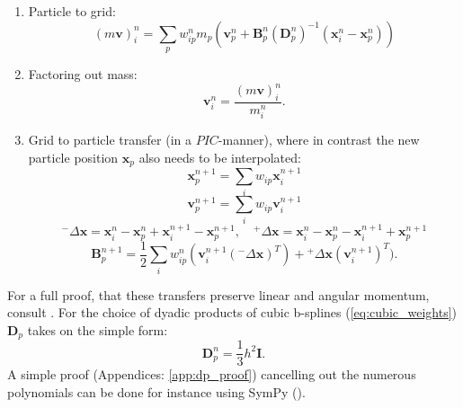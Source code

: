 \documentclass[m,times]{cgMA}
\begin{document}
\begin{enumerate}
  \item Particle to grid:
    \begin{equation}\label{eq:apic_mom_p2g}
    (m\boldsymbol{v})^n_i = \sum_p w^n_{ip}m_p (\boldsymbol { v } _ { p } ^ { n } + \boldsymbol { B } _ { p } ^ { n } ( \boldsymbol { D } _ { p } ^ { n } ) ^ { - 1 } ( \boldsymbol { x } _ { i } ^ { n } - \boldsymbol { x } _ { p } ^ { n } ) )
\end{equation}
  \item Factoring out mass:
    \begin{equation}\label{eq:mass_divide}
      \boldsymbol{v}_i^n = \frac{(m\boldsymbol{v})_i^n}{m_i^n}.
    \end{equation}
  \item Grid to particle transfer (in a $PIC$-manner), where in contrast the new particle position $\boldsymbol{x}_p$ also needs to be interpolated:
    \begin{equation}
      \boldsymbol{x}_{p}^{n+1} = \sum_i w_{ip}\boldsymbol{x}_i^{n+1}
    \end{equation}
    \begin{equation}
      \boldsymbol{v}_{p}^{n+1} = \sum_i w_{ip}\boldsymbol{v}_i^{n+1}
    \end{equation}
    $$
    {^-}\Delta \boldsymbol{x} = \boldsymbol { x } _ { i } ^ { n } - \boldsymbol { x } _ { p } ^ { n } +   \boldsymbol { x }_ { i } ^ { n + 1 } - \boldsymbol { x } _ { p } ^ { n + 1 },
    \quad {^+}\Delta \boldsymbol{x} = \boldsymbol { x } _ { i } ^ { n } - \boldsymbol { x } _ { p } ^ { n } -  { \boldsymbol { x } } _ { i } ^ { n + 1 } + \boldsymbol { x } _ { p } ^ { n + 1 }
    $$
\begin{equation}\label{eq:apic_mom_g2p}
  \boldsymbol { B } _ { p } ^ { n + 1 } = \frac { 1 } { 2 } \sum _ { i } w _ { i p } ^ { n } (\boldsymbol { v }_ { i } ^ { n + 1 } ({^-}\Delta \boldsymbol{x}) ^ { T }) {+}  {^+}\Delta \boldsymbol{x} ( { \boldsymbol { v } } _ { i } ^ { n + 1 } ) ^ { T }).
\end{equation}

\end{enumerate}
For a full proof, that these transfers preserve linear and angular momentum, consult \cite{MPM:APIC}. For the choice of dyadic products of cubic b-splines (\ref{eq:cubic_weights}) $\boldsymbol{D}_p$ takes on the simple form:
\begin{equation}
\boldsymbol{D}_p^n = \frac { 1 } { 3 } h ^ { 2 } \boldsymbol { I }.
\end{equation}
A simple proof (Appendices: \ref{app:dp_proof}) cancelling out the numerous polynomials can be done for instance using SymPy (\cite{Sympy}).\cite{MPM:APIC}\cite{MPM:OLD_APIC}
\end{document}
